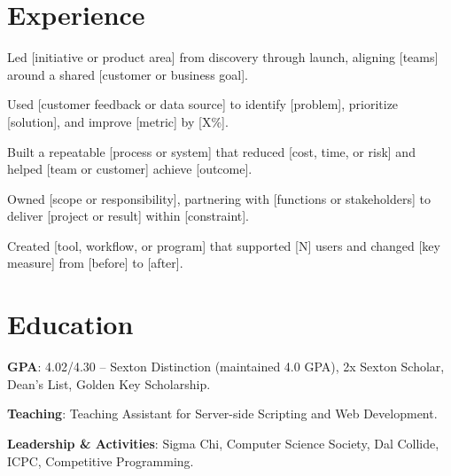 \documentclass{resume}
\begin{document}

\section{Experience}

\begin{jobduties}
  \item Led [initiative or product area] from discovery through launch, aligning [teams] around a shared [customer or business goal].
  \item Used [customer feedback or data source] to identify [problem], prioritize [solution], and improve [metric] by [X\%].
  \item Built a repeatable [process or system] that reduced [cost, time, or risk] and helped [team or customer] achieve [outcome].
\end{jobduties}

\begin{jobduties}
  \item Owned [scope or responsibility], partnering with [functions or stakeholders] to deliver [project or result] within [constraint].
  \item Created [tool, workflow, or program] that supported [N] users and changed [key measure] from [before] to [after].
\end{jobduties}

\section{Education}

\begin{jobduties}
  \item \textbf{GPA}: 4.02/4.30 -- Sexton Distinction (maintained 4.0 GPA), 2x Sexton Scholar, Dean's List, Golden Key Scholarship.
  \item \textbf{Teaching}: Teaching Assistant for Server-side Scripting and Web Development.
  \item \textbf{Leadership \& Activities}: Sigma Chi, Computer Science Society, Dal Collide, ICPC, Competitive Programming.
\end{jobduties}
\end{document}
